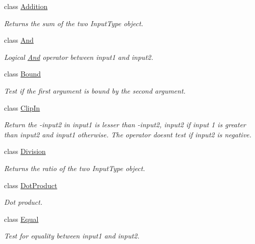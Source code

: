 \begin{DoxyCompactItemize}
\item 
class \hyperlink{classvct_binary_operations_1_1_addition}{Addition}
\begin{DoxyCompactList}\small\item\em Returns the sum of the two Input\+Type object. \end{DoxyCompactList}\item 
class \hyperlink{classvct_binary_operations_1_1_and}{And}
\begin{DoxyCompactList}\small\item\em Logical \hyperlink{classvct_binary_operations_1_1_and}{And} operator between input1 and input2. \end{DoxyCompactList}\item 
class \hyperlink{classvct_binary_operations_1_1_bound}{Bound}
\begin{DoxyCompactList}\small\item\em Test if the first argument is bound by the second argument. \end{DoxyCompactList}\item 
class \hyperlink{classvct_binary_operations_1_1_clip_in}{Clip\+In}
\begin{DoxyCompactList}\small\item\em Return the -\/input2 in input1 is lesser than -\/input2, input2 if input 1 is greater than input2 and input1 otherwise. The operator doesn\textquotesingle{}t test if input2 is negative. \end{DoxyCompactList}\item 
class \hyperlink{classvct_binary_operations_1_1_division}{Division}
\begin{DoxyCompactList}\small\item\em Returns the ratio of the two Input\+Type object. \end{DoxyCompactList}\item 
class \hyperlink{classvct_binary_operations_1_1_dot_product}{Dot\+Product}
\begin{DoxyCompactList}\small\item\em Dot product. \end{DoxyCompactList}\item 
class \hyperlink{classvct_binary_operations_1_1_equal}{Equal}
\begin{DoxyCompactList}\small\item\em Test for equality between input1 and input2. \end{DoxyCompactList}\item 

\end{DoxyCompactItemize}
